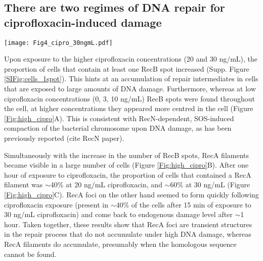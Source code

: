\subsection*{There are two regimes of DNA repair for ciprofloxacin-induced damage}

\begin{figure*}[htbp]
\begin{center}
\texttt{[image: Fig4\_cipro\_30ngmL.pdf]}
\end{center}
\caption{}
\label{Fig:high_cipro}
\end{figure*}


Upon exposure to the higher cipro\-floxacin concentrations (20 and 30 ng/mL), the proportion of cells that contain at least one RecB spot increased (Supp. Figure \ref{SIFig:cells_1spot}). This hints at an accumulation of repair intermediates in cells that are exposed to large amounts of DNA damage. Furthermore, whereas at low ciprofloxacin concentrations (0, 3, 10 ng/mL) RecB spots were found throughout the cell, at higher concentrations they appeared more centred in the cell (Figure \ref{Fig:high_cipro}A). This is consistent with RecN-dependent, SOS-induced compaction of the bacterial chromosome upon DNA damage, as has been previously reported (cite RecN paper).

Simultaneously with the increase in the number of RecB spots, RecA filaments became visible in a large number of cells (Figure \ref{Fig:high_cipro}B). After one hour of exposure to ciprofloxacin, the proportion of cells that contained a RecA filament was $\sim$40\% at 20 ng/mL ciprofloxacin, and $\sim$60\% at 30 ng/mL (Figure \ref{Fig:high_cipro}C). RecA foci on the other hand seemed to form quickly following ciprofloxacin exposure (present in $\sim$40\% of the cells after 15 min of exposure to 30 ng/mL ciprofloxacin) and come back to endogenous damage level after $\sim$1 hour. Taken together, these results show that RecA foci are transient structures in the repair process that do not accumulate under high DNA damage, whereas RecA filaments do accumulate, presumably when the homologous sequence cannot be found.


